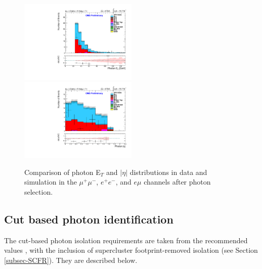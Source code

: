 \begin{figure}
\includegraphics[width=0.5\textwidth]{Plots/ControlPlots/TTbarPhotonAnalysis/EMu/Photons/SignalPhotons/Photon_ET_splitTTbar_ratio.pdf}
\includegraphics[width=0.5\textwidth]{Plots/ControlPlots/TTbarPhotonAnalysis/EMu/Photons/SignalPhotons/Photon_AbsEta_splitTTbar_ratio.pdf} 
\caption{Comparison of photon E$_{T}$ and $|\eta|$ distributions in data and simulation in the $\mu^{+}\mu^{-}$, $e^{+}e^{-}$, and $e\mu$ channels after photon selection.}
\label{fig-photonSelectionETandEta}
\end{figure}

\subsection{Cut based photon identification}

The cut-based photon isolation requirements are taken from the recommended values \cite{CutBasedIsolation2012}, with the inclusion of supercluster footprint-removed isolation (see Section \ref{subsec-SCFR}). They are described below.

